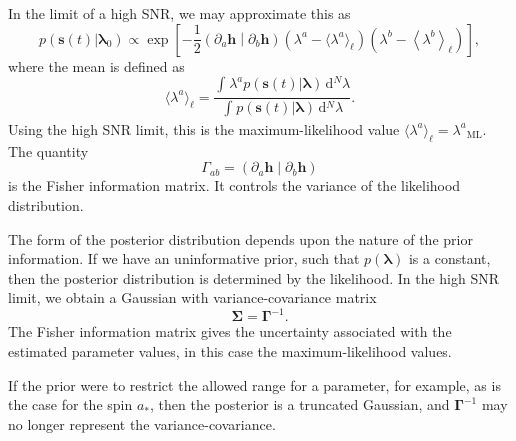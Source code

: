 \documentclass[useAMS,usedcolumn,usegraphicx,usenatbib]{mn2e}
\newcommand{\sub}[1]{\ensuremath{_\mathrm{#1}}}
\newcommand{\dd}{\ensuremath{\mathrm{d}}}
\newcommand{\intd}[4]{\ensuremath{\int_{#1}^{#2}{#3}\,\dd{#4}}}
\newcommand{\recip}[1]{\ensuremath{\frac{1}{#1}}}
\newcommand{\innerprod}[2]{\ensuremath{\left({#1}\middle|{#2}\right)}}
\begin{document}
In the limit of a high SNR, we may approximate this as \citep{Vallisneri2008}
\begin{equation}
p(\boldsymbol{s}(t)|\boldsymbol{\lambda}_0) \propto \exp\left[-\recip{2}\innerprod{\partial_a\boldsymbol{h}}{\partial_b\boldsymbol{h}}\left(\lambda^a - \langle\lambda^a\rangle_\ell\right)\left(\lambda^b - \left\langle\lambda^b\right\rangle_\ell\right)\right],
\label{eq:LSA}
\end{equation}
where the mean is defined as
\begin{equation}
\langle\lambda^a\rangle_\ell = \frac{\intd{}{}{\lambda^a p(\boldsymbol{s}(t)|\boldsymbol{\lambda})}{^N \lambda}}{\intd{}{}{p(\boldsymbol{s}(t)|\boldsymbol{\lambda})}{^N \lambda}}.
\end{equation}
Using the high SNR limit, this is the maximum-likelihood value $\langle\lambda^a\rangle_\ell = \lambda^a\sub{ML}$. The quantity
\begin{equation}
\Gamma_{ab} = \innerprod{\partial_a\boldsymbol{h}}{\partial_b\boldsymbol{h}}
\label{eq:Fisher}
\end{equation}
is the Fisher information matrix. It controls the variance of the likelihood distribution.

The form of the posterior distribution depends upon the nature of the prior information. If we have an uninformative prior, such that $p(\boldsymbol{\lambda})$ is a constant, then the posterior distribution is determined by the likelihood. In the high SNR limit, we obtain a Gaussian with variance-covariance matrix
\begin{equation}
\boldsymbol{\Sigma} = \boldsymbol{\Gamma}^{-1}.
\label{eq:InvFisher}
\end{equation}
The Fisher information matrix gives the uncertainty associated with the estimated parameter values, in this case the maximum-likelihood values.

If the prior were to restrict the allowed range for a parameter, for example, as is the case for the spin $a_\ast$, then the posterior is a truncated Gaussian, and $\boldsymbol{\Gamma}^{-1}$ may no longer represent the variance-covariance.
\end{document}
